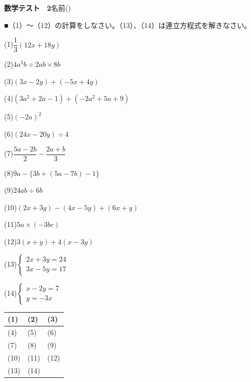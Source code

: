 \documentclass[a4paper,11pt]{ltjsarticle}
\newlength{\qcol}\setlength{\qcol}{0.47\textwidth}
\newlength{\qgap}
\newlength{\anscolw}\setlength{\anscolw}{0.30\textwidth}
\newlength{\ansh}
\newcommand{\Q}[2]{\parbox[t]{\qcol}{\raggedright (#1)\hspace{0.6em}$\displaystyle #2$}}
\newcommand{\QR}[4]{\Q{#1}{#2}\hfill\Q{#3}{#4}\par\vspace{\qgap}}
\newcommand{\anscell}[1]{\rule[-\ansdrop]{0pt}{\ansh}(#1)}
\newlength{\ansdrop}
\begin{document}
{\large\bfseries 数学テスト　2}\hfill 名前(\underline{\hspace{32mm}})\par\vspace{3mm}
■（1）〜（12）の計算をしなさい。（13）、（14）は連立方程式を解きなさい。\par\vspace{3mm}
\setlength{\qgap}{11mm}
\QR{1}{\dfrac{1}{3}(12x+18y)}{2}{4a^3b\div2ab\times8b}
\QR{3}{(3x-2y)+(-5x+4y)}{4}{(3a^2+2a-1)+(-2a^2+5a+9)}
\QR{5}{(-2a)^2}{6}{(24x-20y)\div4}
\QR{7}{\dfrac{5a-2b}{2}-\dfrac{2a+b}{3}}{8}{9a-\{3b+(5a-7b)-1\}}
\QR{9}{24ab\div6b}{10}{(2x+3y)-(4x-5y)+(6x+y)}
\QR{11}{5a\times(-3bc)}{12}{3(x+y)+4(x-3y)}
\QR{13}{\left\{\begin{array}{l} 2x+3y=24 \\ 3x-5y=17 \end{array}\right.}{14}{\left\{\begin{array}{l} x-2y=7 \\ y=-3x \end{array}\right.}
\vspace{2mm}
\setlength{\ansh}{11mm}\setlength{\ansdrop}{7mm}%
\begin{center}\begin{tabular}{|p{\anscolw}|p{\anscolw}|p{\anscolw}|}\hline
\anscell{1} & \anscell{2} & \anscell{3} \\\hline
\anscell{4} & \anscell{5} & \anscell{6} \\\hline
\anscell{7} & \anscell{8} & \anscell{9} \\\hline
\anscell{10} & \anscell{11} & \anscell{12} \\\hline
\anscell{13} & \anscell{14} &  \\\hline
\end{tabular}\end{center}

\newpage
\end{document}
